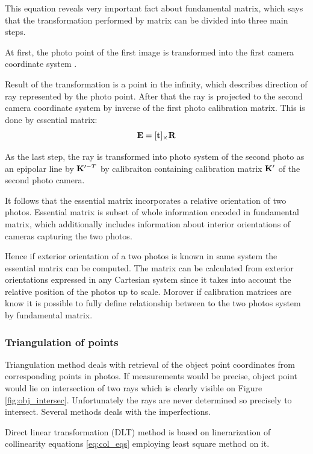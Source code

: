 \documentclass[a4paper,12pt]{article}
\newcommand{\ematr}[1]{
{\bf #1}
}
\newcommand{\evect}[1]{
{\bf #1}
}
\begin{document}
This equation reveals very important fact about fundamental matrix, which says that the transformation performed 
by matrix can be divided into three main steps.

At first, the photo point of the first image is transformed into the first camera coordinate system .

Result of the transformation is a
point in the infinity, which describes direction of ray represented by the photo point. 
After that the ray is projected to the second camera coordinate system by  inverse of the 
first photo calibration matrix. 
This is done by essential matrix:
\begin{equation}
	 \ematr{E}  = [\evect{t}]_{\times} \ematr{R}
\end{equation}

As the last step, the ray is transformed into photo system of the second photo as an epipolar line
by $\ematr{K}'^{-T}$ by calibraiton containing calibration matrix $\ematr{K}'$ of the second photo camera.

It follows that the essential matrix incorporates a relative orientation of two photos.
Essential matrix is subset of whole information encoded in fundamental matrix, which 
additionally includes information about interior orientations of cameras capturing the two photos.  

Hence if exterior orientation of a two photos is known in same system the
essential matrix can be computed. The matrix can be calculated from exterior 
orientations expressed in any Cartesian system since it takes into account the relative 
position of the photos up to scale. Morover if calibration matrices 
are know it is possible to fully define relationship between 
to the two photos system by fundamental matrix.

\subsubsection{Triangulation of points}
\label{sec:triang}

Triangulation method deals with retrieval of the object point coordinates
from corresponding points in photos. 
If measurements would be precise, object point 
would lie on intersection of two rays which is clearly visible on 
 Figure \ref{fig:obj_intersec}. Unfortunately the rays are never determined so precisely to intersect.
 Several methods deals with the imperfections.

Direct linear transformation (DLT) method  is based 
on linerarization of collinearity equations \eqref{eq:col_eqs}
employing least square method on it.
\end{document}
